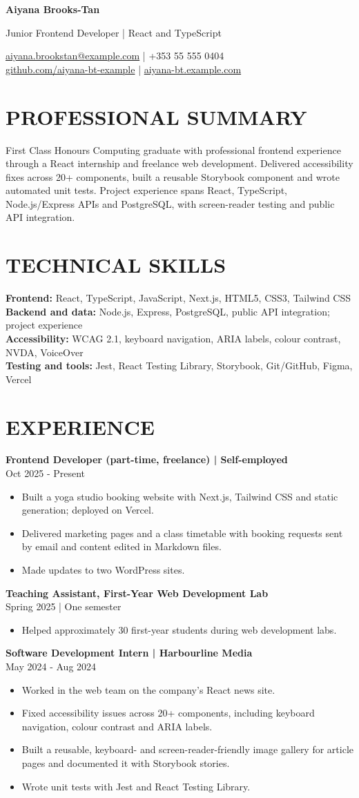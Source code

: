 \documentclass[11pt,a4paper]{article}
\newcommand{\cvsection}[1]{\section*{#1}}
\newcommand{\cvrole}[2]{\textbf{#1}\\#2\par}
\begin{document}
{\Huge\bfseries\color{primarycolor} Aiyana Brooks-Tan}\par
{\large\color{accentcolor} Junior Frontend Developer | React and TypeScript}\par
\href{mailto:aiyana.brookstan@example.com}{aiyana.brookstan@example.com} | +353 55 555 0404\\
\href{https://github.com/aiyana-bt-example}{github.com/aiyana-bt-example} | \href{https://aiyana-bt.example.com}{aiyana-bt.example.com}

\cvsection{PROFESSIONAL SUMMARY}
First Class Honours Computing graduate with professional frontend experience through a React internship and freelance web development. Delivered accessibility fixes across 20+ components, built a reusable Storybook component and wrote automated unit tests. Project experience spans React, TypeScript, Node.js/Express APIs and PostgreSQL, with screen-reader testing and public API integration.

\cvsection{TECHNICAL SKILLS}
\textbf{Frontend:} React, TypeScript, JavaScript, Next.js, HTML5, CSS3, Tailwind CSS\\
\textbf{Backend and data:} Node.js, Express, PostgreSQL, public API integration; project experience\\
\textbf{Accessibility:} WCAG 2.1, keyboard navigation, ARIA labels, colour contrast, NVDA, VoiceOver\\
\textbf{Testing and tools:} Jest, React Testing Library, Storybook, Git/GitHub, Figma, Vercel

\cvsection{EXPERIENCE}
\cvrole{Frontend Developer (part-time, freelance) | Self-employed}{Oct 2025 - Present}
\begin{itemize}
\item Built a yoga studio booking website with Next.js, Tailwind CSS and static generation; deployed on Vercel.
\item Delivered marketing pages and a class timetable with booking requests sent by email and content edited in Markdown files.
\item Made updates to two WordPress sites.
\end{itemize}

\cvrole{Teaching Assistant, First-Year Web Development Lab}{Spring 2025 | One semester}
\begin{itemize}
\item Helped approximately 30 first-year students during web development labs.
\end{itemize}

\cvrole{Software Development Intern | Harbourline Media}{May 2024 - Aug 2024}
\begin{itemize}
\item Worked in the web team on the company's React news site.
\item Fixed accessibility issues across 20+ components, including keyboard navigation, colour contrast and ARIA labels.
\item Built a reusable, keyboard- and screen-reader-friendly image gallery for article pages and documented it with Storybook stories.
\item Wrote unit tests with Jest and React Testing Library.
\end{itemize}
\end{document}
